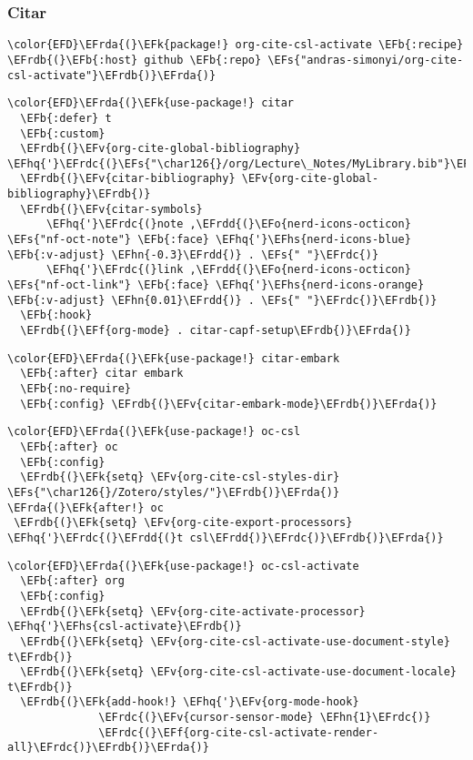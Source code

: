\documentclass[12pt]{article}
\theoremstyle{plain}%
\theoremstyle{definition}
\theoremstyle{remark}
\newcommand{\EFs}[1]{\textcolor{EFs}{#1}} %
\newcommand{\EFk}[1]{\textcolor{EFk}{#1}} %
\newcommand{\EFb}[1]{\textcolor{EFb}{#1}} %
\newcommand{\EFf}[1]{\textcolor{EFf}{#1}} %
\newcommand{\EFv}[1]{\textcolor{EFv}{#1}} %
\newcommand{\EFo}[1]{\textcolor{EFo}{#1}} %
\newcommand{\EFhn}[1]{\textcolor{EFhn}{\textbf{#1}}} %
\newcommand{\EFhq}[1]{\textcolor{EFhq}{#1}} %
\newcommand{\EFhs}[1]{\textcolor{EFhs}{#1}} %
\newcommand{\EFrda}[1]{\textcolor{EFrda}{#1}} %
\newcommand{\EFrdb}[1]{\textcolor{EFrdb}{#1}} %
\newcommand{\EFrdc}[1]{\textcolor{EFrdc}{#1}} %
\newcommand{\EFrdd}[1]{\textcolor{EFrdd}{#1}} %
\begin{document}
\subsubsection{Citar}
\label{sec:orgef2783a}
\begin{Code}
\begin{Verbatim}
\color{EFD}\EFrda{(}\EFk{package!} org-cite-csl-activate \EFb{:recipe} \EFrdb{(}\EFb{:host} github \EFb{:repo} \EFs{"andras-simonyi/org-cite-csl-activate"}\EFrdb{)}\EFrda{)}
\end{Verbatim}
\end{Code}
\begin{Code}
\begin{Verbatim}
\color{EFD}\EFrda{(}\EFk{use-package!} citar
  \EFb{:defer} t
  \EFb{:custom}
  \EFrdb{(}\EFv{org-cite-global-bibliography} \EFhq{'}\EFrdc{(}\EFs{"\char126{}/org/Lecture\_Notes/MyLibrary.bib"}\EFrdc{)}\EFrdb{)}
  \EFrdb{(}\EFv{citar-bibliography} \EFv{org-cite-global-bibliography}\EFrdb{)}
  \EFrdb{(}\EFv{citar-symbols}
      \EFhq{'}\EFrdc{(}note ,\EFrdd{(}\EFo{nerd-icons-octicon} \EFs{"nf-oct-note"} \EFb{:face} \EFhq{'}\EFhs{nerd-icons-blue} \EFb{:v-adjust} \EFhn{-0.3}\EFrdd{)} . \EFs{" "}\EFrdc{)}
      \EFhq{'}\EFrdc{(}link ,\EFrdd{(}\EFo{nerd-icons-octicon} \EFs{"nf-oct-link"} \EFb{:face} \EFhq{'}\EFhs{nerd-icons-orange} \EFb{:v-adjust} \EFhn{0.01}\EFrdd{)} . \EFs{" "}\EFrdc{)}\EFrdb{)}
  \EFb{:hook}
  \EFrdb{(}\EFf{org-mode} . citar-capf-setup\EFrdb{)}\EFrda{)}
\end{Verbatim}
\end{Code}
\begin{Code}
\begin{Verbatim}
\color{EFD}\EFrda{(}\EFk{use-package!} citar-embark
  \EFb{:after} citar embark
  \EFb{:no-require}
  \EFb{:config} \EFrdb{(}\EFv{citar-embark-mode}\EFrdb{)}\EFrda{)}
\end{Verbatim}
\end{Code}
\begin{Code}
\begin{Verbatim}
\color{EFD}\EFrda{(}\EFk{use-package!} oc-csl
  \EFb{:after} oc
  \EFb{:config}
  \EFrdb{(}\EFk{setq} \EFv{org-cite-csl-styles-dir} \EFs{"\char126{}/Zotero/styles/"}\EFrdb{)}\EFrda{)}
\EFrda{(}\EFk{after!} oc
 \EFrdb{(}\EFk{setq} \EFv{org-cite-export-processors} \EFhq{'}\EFrdc{(}\EFrdd{(}t csl\EFrdd{)}\EFrdc{)}\EFrdb{)}\EFrda{)}

\end{Verbatim}
\end{Code}
\begin{Code}
\begin{Verbatim}
\color{EFD}\EFrda{(}\EFk{use-package!} oc-csl-activate
  \EFb{:after} org
  \EFb{:config}
  \EFrdb{(}\EFk{setq} \EFv{org-cite-activate-processor} \EFhq{'}\EFhs{csl-activate}\EFrdb{)}
  \EFrdb{(}\EFk{setq} \EFv{org-cite-csl-activate-use-document-style} t\EFrdb{)}
  \EFrdb{(}\EFk{setq} \EFv{org-cite-csl-activate-use-document-locale} t\EFrdb{)}
  \EFrdb{(}\EFk{add-hook!} \EFhq{'}\EFv{org-mode-hook}
              \EFrdc{(}\EFv{cursor-sensor-mode} \EFhn{1}\EFrdc{)}
              \EFrdc{(}\EFf{org-cite-csl-activate-render-all}\EFrdc{)}\EFrdb{)}\EFrda{)}

\end{Verbatim}
\end{Code}
\end{document}
